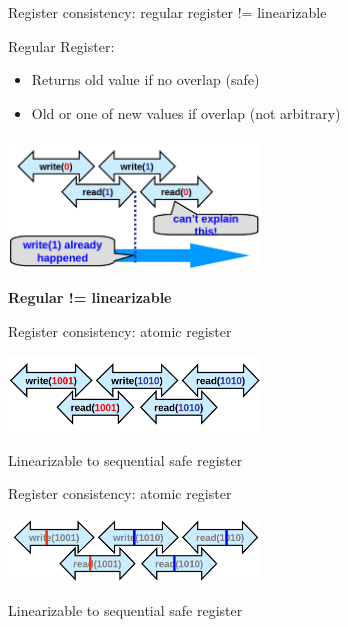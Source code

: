 \begin{frame}{Register consistency: regular register != linearizable}

Regular Register:
\begin{itemize}
  \item Returns old value if no overlap (safe)
  \item Old or one of new values if overlap (not arbitrary)
\end{itemize}

\begin{center}
  \includegraphics[width=0.5\textwidth]{./pics/regular/reg5.png}
\end{center}

\pause

\begin{center}
  \textbf{Regular != linearizable}
\end{center}

\end{frame}


\begin{frame}[t,fragile]{Register consistency: atomic register}

\begin{center}
  \includegraphics[width=0.5\textwidth]{./pics/atomic/atomic1.png}
\end{center}

Linearizable to sequential safe register

\end{frame}


\begin{frame}{Register consistency: atomic register}

\begin{center}
  \includegraphics[width=0.5\textwidth]{./pics/atomic/atomic2.png}
\end{center}

Linearizable to sequential safe register

\end{frame}

